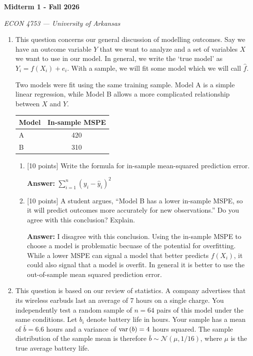 \documentclass[12pt]{article}
\newcommand{\answer}[1]{{\color{blue_winged_teal}\textbf{Answer:} #1}}
\newcommand{\pts}[1]{{\color{zinc500}[#1 points]}}
\begin{document}
\begin{center}
  {\Huge\bf Midterm 1 - Fall 2026}
  
  \smallskip
  {\large\it ECON 4753 — University of Arkansas}
\end{center}

\vspace{5mm}
\begin{enumerate}
  \item This question concerns our general discussion of modelling outcomes. 
  Say we have an outcome variable $Y$ that we want to analyze and a set of variables $X$ we want to use in our model. 
  In general, we write the `true model' as $Y_i = f(X_i) + e_i$.
  With a sample, we will fit some model which we will call $\hat{f}$. 

  Two models were fit using the same training sample.
  Model A is a simple linear regression, while Model B allows a more complicated relationship between $X$ and $Y$.

  \begin{center}
    \begin{tabular}{lc}
      Model & In-sample MSPE \\
      \hline
      A & 420 \\
      B & 310 \\
    \end{tabular}
  \end{center}

  \begin{enumerate}
    \item \pts{10} Write the formula for in-sample mean-squared prediction error.
    
    \answer{$\sum_{i=1}^n (y_i - \hat{y}_i)^2$}
    
    \item \pts{10} A student argues, ``Model B has a lower in-sample MSPE, so it will predict outcomes more accurately for new observations.''
    Do you agree with this conclusion? Explain.

    \answer{I disagree with this conclusion. 
    Using the in-sample MSPE to choose a model is problematic becuase of the potential for overfitting. 
    While a lower MSPE can signal a model that better predicts $f(X_i)$, it could also signal that a model is overfit. 
    In general it is better to use the out-of-sample mean squared prediction error.}
  \end{enumerate}


  \bigskip\bigskip
  \item This question is based on our review of statistics.
  A company advertises that its wireless earbuds last an average of 7 hours on a single charge.
  You independently test a random sample of $n = 64$ pairs of this model under the same conditions.
  Let $b_i$ denote battery life in hours.
  Your sample has a mean of $\bar{b} = 6.6$ hours and a variance of $\var{b} = 4$ hours squared.
  The sample distribution of the sample mean is therefore $\bar{b} \sim \mathcal{N}( \mu, 1 / 16 )$, where $\mu$ is the true average battery life.


\end{enumerate}
\end{document}
